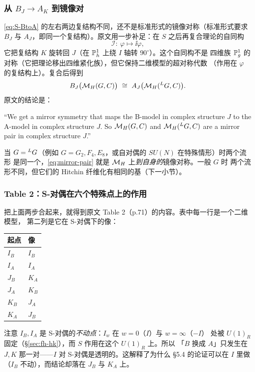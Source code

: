 \subsubsection*{从 $B_J\to A_K$ 到镜像对}

\eqref{eq:S-BtoA} 的左右两边复结构不同，还不是标准形式的镜像对称（标准形式要求
$B_J$ 与 $A_J$，即同一个复结构）。原文用一步补足：在 $S$ 之后再复合理论的自同构
\begin{equation}
\mathcal I:\ \varphi\longmapsto\ii\varphi ,
\label{eq:phi-i-phi}
\end{equation}
它把复结构 $K$ 旋转回 $J$（在 $\mathbb{P}^1_h$ 上绕 $I$ 轴转 $90^\circ$）。这个自同构不是
四维族 $\mathbb{P}^1_g$ 的对称（它把理论移出四维紧化族），但它保持二维模型的超对称代数
（作用在 $\varphi$ 的复结构上）。复合后得到
\begin{equation}
B_J\bigl(\MH(G,C)\bigr)\ \cong\ A_J\bigl(\MH(\Ldual,C)\bigr).
\label{eq:mirror-pair}
\end{equation}
原文的结论是：\pA{}
\begin{origquote}
“We get a mirror symmetry that maps the B-model in complex structure $J$ to the A-model in complex structure $J$. So $\mathcal{M}_H(G,C)$ and $\mathcal{M}_H({}^LG,C)$ are a mirror pair in complex structure $J$.”
\end{origquote}
当 $G={}^{L}G$（例如 $G=G_2,F_4,E_8$，或自对偶的 $SU(N)$ 在特殊情形）时两个流形
是同一个，\eqref{eq:mirror-pair} 就是 $\mathcal{M}_H$ 上\emph{到自身的}镜像对称。一般 $G$ 时
两个流形不同，但它们的 Hitchin 纤维化有相同的基（下一小节）。

\subsubsection*{Table 2：S-对偶在六个特殊点上的作用}

把上面两步合起来，就得到原文 Table 2（p.71）的内容。表中每一行是一个二维模型，
第二列是它在 S-对偶下的像：\pA{}
\begin{center}
\begin{tabular}{@{}ll@{}}
\toprule
起点 & 像 \\
\midrule
$I_B$ & $I_B$ \\
$I_A$ & $I_A$ \\
$J_B$ & $K_A$ \\
$J_A$ & $K_B$ \\
$K_B$ & $J_A$ \\
$K_A$ & $J_B$ \\
\bottomrule
\end{tabular}
\end{center}
注意 $I_B,I_A$ 是 S-对偶的\emph{不动点}：$I_w$ 在 $w=0$（$I$）与 $w=\infty$（$-I$）
处被 $U(1)_R$ 固定（§\ref{sec:fh-hk}），而 $S$ 作用在这个 $U(1)_R$ 上。所以
「$B$ 换成 $A$」只发生在 $J,K$ 那一对——$I$ 对 S-对偶是透明的。这解释了为什么
§5.4 的论证可以在 $I$ 里做（$I_B$ 不动），而结论却落在 $J_B$ 与 $K_A$ 上。
\pA{}

